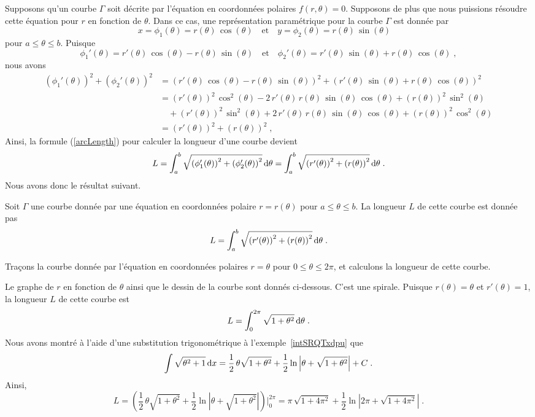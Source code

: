{Supposons qu'un courbe $\Gamma$ soit décrite par l'équation en
coordonnées polaires $f(r,\theta)=0$.  Supposons de plus que nous
puissions résoudre cette équation pour $r$ en fonction de $\theta$.  Dans
ce cas, une représentation paramétrique pour la courbe $\Gamma$ est
donnée par
\[
x=\phi_1(\theta) = r(\theta)\,\cos(\theta) \quad \text{et} \quad
y= \phi_2(\theta) = r(\theta)\,\sin(\theta) \quad
\]
pour $a\leq \theta \leq b$.  Puisque
\[
\phi_1'(\theta) = r'(\theta)\,\cos(\theta) - r(\theta)\,\sin(\theta)
\quad \text{et} \quad
\phi_2'(\theta) = r'(\theta)\,\sin(\theta) + r(\theta)\,\cos(\theta)
\; ,
\]
nous avons
\begin{align*}
\left(\phi_1'(\theta)\right)^2 + \left(\phi_2'(\theta)\right)^2
&= \left( r'(\theta)\,\cos(\theta) - r(\theta)\,\sin(\theta)\right)^2
+ \left(r'(\theta)\,\sin(\theta) + r(\theta)\,\cos(\theta)\right)^2 \\
&= \left(r'(\theta)\right)^2\,\cos^2(\theta)
-2\,r'(\theta)\,r(\theta)\,\sin(\theta)\,\cos(\theta)
+\left(r(\theta)\right)^2\,\sin^2(\theta)\\
&\quad +\left(r'(\theta)\right)^2\,\sin^2(\theta)
+2\,r'(\theta)\,r(\theta)\,\sin(\theta)\,\cos(\theta)
+\left(r(\theta)\right)^2\,\cos^2(\theta) \\
&= \left(r'(\theta)\right)^2 + \left(r(\theta)\right)^2 \; ,
\end{align*}
Ainsi, la formule (\ref{arcLength}) pour calculer la longueur d'une
courbe devient
\[
L = \int_a^b \sqrt{\left(\phi_1'(\theta)\right)^2
+ \left(\phi_2'(\theta)\right)^2} \,\mathrm{d}\theta
= \int_a^b
\sqrt{\left(r'(\theta)\right)^2 + \left(r(\theta)\right)^2}
\,\mathrm{d}\theta \; .
\]
Nous avons donc le résultat suivant.

\begin{focus}{\prp}
Soit $\Gamma$ une courbe donnée par une équation en coordonnées
polaire $r = r(\theta)$ pour $a \leq \theta \leq b$.  La longueur $L$
de cette courbe est donnée pas
\begin{equation} \label{arclengthPolar}
L = \int_a^b
\sqrt{\left(r'(\theta)\right)^2 + \left(r(\theta)\right)^2}
\,\mathrm{d}\theta \; .
\end{equation}
\end{focus}

\begin{egg}
Traçons la courbe donnée par l'équation en coordonnées polaires
$r=\theta$ pour $0\leq \theta \leq 2\pi$, et calculons la longueur de
cette courbe.

Le graphe de $r$ en fonction de $\theta$ ainsi que le dessin de la
courbe sont donnés ci-dessous.
C'est une spirale.  Puisque $r(\theta) = \theta$ et
$r'(\theta)= 1$, la longueur $L$ de cette courbe est
\[
L = \int_0^{2\pi} \sqrt{1 + \theta^2} \,\mathrm{d}\theta \; .
\]
Nous avons montré à l'aide d'une substitution trigonométrique à
l'exemple~\ref{intSRQTxdpu} que
\[
\int \sqrt{\theta^2+1} \,\mathrm{d}x = \frac{1}{2}\, \theta\sqrt{1+\theta^2}
+ \frac{1}{2} \ln\left|\theta + \sqrt{1+\theta^2}\right| + C\; .
\]
Ainsi,
\[
L = \left( \frac{1}{2}\, \theta\sqrt{1+\theta^2}
+ \frac{1}{2} \ln\left|\theta + \sqrt{1+\theta^2}\right|\right)\bigg|_0^{2\pi}
= \pi\,\sqrt{1+4\pi^2} +
\frac{1}{2} \ln\left|2\pi+\sqrt{1+4\pi^2}\right| \; .
\]
\end{egg}

}
